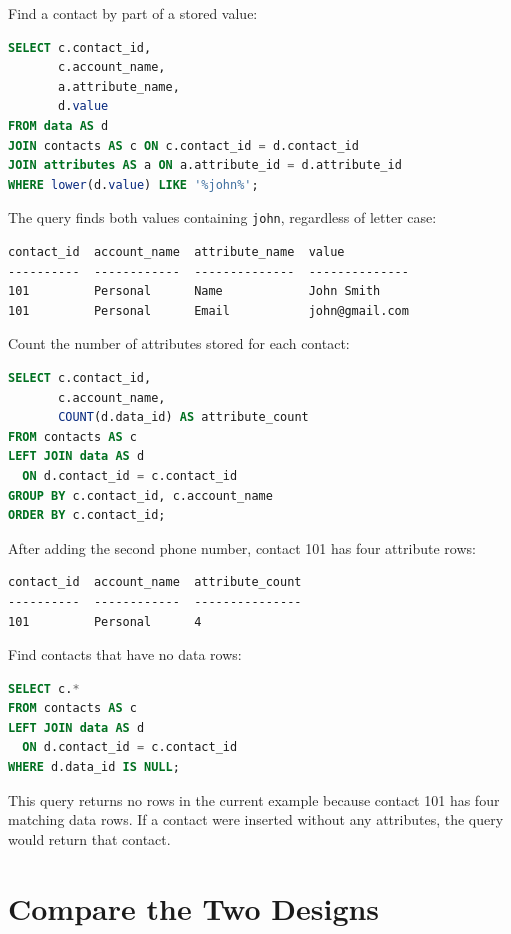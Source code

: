 \documentclass[11pt]{article}
\begin{document}
Find a contact by part of a stored value:

\begin{lstlisting}[language=SQL]
SELECT c.contact_id,
       c.account_name,
       a.attribute_name,
       d.value
FROM data AS d
JOIN contacts AS c ON c.contact_id = d.contact_id
JOIN attributes AS a ON a.attribute_id = d.attribute_id
WHERE lower(d.value) LIKE '%john%';
\end{lstlisting}

The query finds both values containing \texttt{john}, regardless of letter
case:

\begin{verbatim}
contact_id  account_name  attribute_name  value
----------  ------------  --------------  --------------
101         Personal      Name            John Smith
101         Personal      Email           john@gmail.com
\end{verbatim}

Count the number of attributes stored for each contact:

\begin{lstlisting}[language=SQL]
SELECT c.contact_id,
       c.account_name,
       COUNT(d.data_id) AS attribute_count
FROM contacts AS c
LEFT JOIN data AS d
  ON d.contact_id = c.contact_id
GROUP BY c.contact_id, c.account_name
ORDER BY c.contact_id;
\end{lstlisting}

After adding the second phone number, contact 101 has four attribute rows:

\begin{verbatim}
contact_id  account_name  attribute_count
----------  ------------  ---------------
101         Personal      4
\end{verbatim}

Find contacts that have no data rows:

\begin{lstlisting}[language=SQL]
SELECT c.*
FROM contacts AS c
LEFT JOIN data AS d
  ON d.contact_id = c.contact_id
WHERE d.data_id IS NULL;
\end{lstlisting}

This query returns no rows in the current example because contact 101 has four
matching data rows. If a contact were inserted without any attributes, the
query would return that contact.

\section*{Compare the Two Designs}
\end{document}

